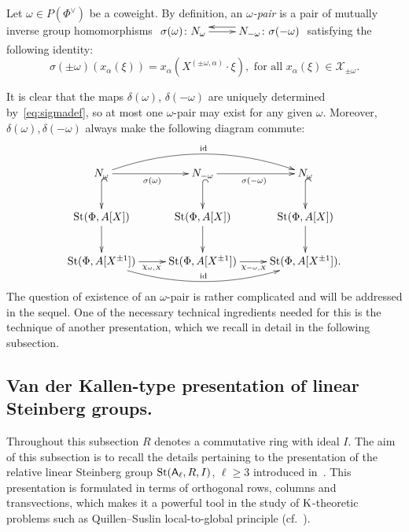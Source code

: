 \begin{dfn} \label{dfn:delta-pair}
Let $\omega \in P(\Phi^\vee)$ be a coweight.
By definition, an {\it $\omega$-pair} is a pair of mutually inverse group homomorphisms
$\xymatrix{ \sigma(\omega)\colon N_\omega \ar[r] & \ar@<-1.0ex>[l] N_{-\omega}\colon \sigma(-\omega) }$ satisfying the following identity:
\begin{equation} \label{eq:sigmadef}
\sigma(\pm \omega)(x_\alpha(\xi)) = x_\alpha(X^{(\pm \omega, \alpha)}\cdot \xi),
 \text{ for all } x_\alpha(\xi) \in \mathcal{X}_{\pm\omega}.
\end{equation}\end{dfn}
It is clear that the maps $\delta(\omega)$, $\delta(-\omega)$ are uniquely determined by~\eqref{eq:sigmadef}, so at most one $\omega$-pair may exist for any given $\omega$.
Moreover, $\delta(\omega), \delta(-\omega)$ always make the following diagram commute:
\begin{equation} \label{eq:sigma-diagram}
\xymatrix{ N_\omega \ar[r]_{\sigma(\omega)}\ar@{^{(}->}[d] \ar@/^1.5pc/[rr]^{\mathrm{id}} & N_{-\omega} \ar@{^{(}->}[d] \ar[r]_{\sigma(-\omega)} & N_\omega \ar@{^{(}->}[d] \\
          \St(\Phi, A[X]) \ar[d] & \St(\Phi, A[X]) \ar[d] & \St(\Phi, A[X]) \ar[d] \\
          \St(\Phi, A[X^{\pm 1}]) \ar@<-0.0ex>[r]_{\chi_{\omega, X}} \ar@/_1.5pc/[rr]^{\mathrm{id}} & \St(\Phi, A[X^{\pm 1}]) \ar@<-0.0ex>[r]_{\chi_{-\omega, X}} & \St(\Phi, A[X^{\pm 1}]).} \end{equation}
The question of existence of an $\omega$-pair is rather complicated and will be addressed in the sequel.
One of the necessary technical ingredients needed for this is the technique of another presentation, which we recall in detail in the following subsection.


\subsection{Van der Kallen-type presentation of linear Steinberg groups.} \label{subsec:another-presentation}
Throughout this subsection $R$ denotes a commutative ring with ideal $I$.
The aim of this subsection is to recall the details pertaining to the presentation of the relative linear Steinberg group $\operatorname{St}(\mathsf{A}_\ell, R, I)$, $\ell \geq 3$ introduced in~\cite{LS17}.
This presentation is formulated in terms of orthogonal rows, columns and transvections, which makes it a powerful tool in the study of $\operatorname{K}$-theoretic problems such as Quillen--Suslin local-to-global principle (cf.~\cite{Tu83, S15, LS17}).

